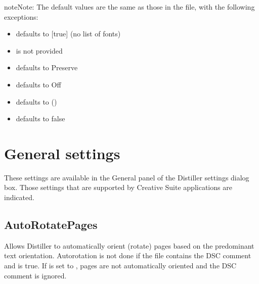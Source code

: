 \documentclass[letterpaper,12pt,english,openany,oneside]{sphinxmanual}
\begin{document}
\begin{sphinxadmonition}{note}{Note:}
The default values are the same as those in the  file, with the following exceptions:
\end{sphinxadmonition}
\begin{itemize}
\item {} 
 defaults to {[}true{]} (no list of fonts)

\item {} 
 is not provided

\item {} 
 defaults to Preserve

\item {} 
 defaults to Off

\item {} 
 defaults to ()

\item {} 
 defaults to false

\end{itemize}




\section{General settings}
\label{\detokenize{PDF_Create_CommonSettings:general-settings}}
These settings are available in the General panel of the Distiller settings dialog box. Those settings that are supported by Creative Suite applications are indicated.


\subsection{AutoRotatePages}
\label{\detokenize{PDF_Create_CommonSettings:autorotatepages}}
Allows Distiller to automatically orient (rotate) pages based on the predominant text orientation. Auto\sphinxhyphen{}rotation is not done if the file contains the  DSC comment and  is true. If  is set to  , pages are not automatically oriented and the  DSC comment is ignored.
\end{document}
